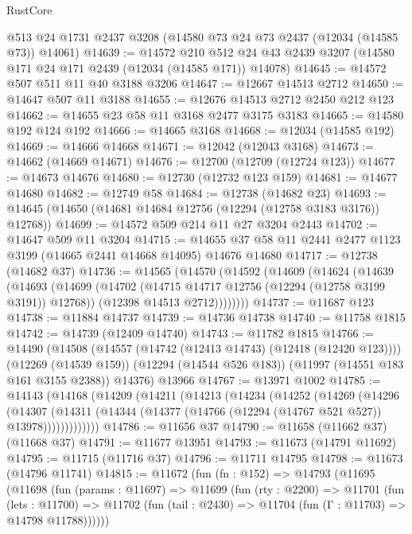 \begin{lexlean}{RustCore}
\begin{coremodule}
    @513
    @24
    @1731
    @2437
    @3208
    (@14580 @73 @24 @73 @2437 (@12034 (@14585 @73)) @14061)
@14639 := @14572
    @210
    @512
    @24
    @43
    @2439
    @3207
    (@14580 @171 @24 @171 @2439 (@12034 (@14585 @171)) @14078)
@14645 := @14572 @507 @511 @11 @40 @3188 @3206
@14647 := @12667 @14513 @2712
@14650 := @14647 @507 @11 @3188
@14655 := @12676 @14513 @2712 @2450 @212 @123
@14662 := @14655 @23 @58 @11 @3168 @2477 @3175 @3183
@14665 := @14580 @192 @124 @192
@14666 := @14665 @3168
@14668 := @12034 (@14585 @192)
@14669 := @14666 @14668
@14671 := @12042 (@12043 @3168)
@14673 := @14662 (@14669 @14671)
@14676 := @12700 (@12709 (@12724 @123))
@14677 := @14673 @14676
@14680 := @12730 (@12732 @123 @159)
@14681 := @14677 @14680
@14682 := @12749 @58
@14684 := @12738 (@14682 @23)
@14693 := @14645 (@14650 (@14681 @14684 @12756 (@12294 (@12758 @3183 @3176)) @12768))
@14699 := @14572 @509 @214 @11 @27 @3204 @2443
@14702 := @14647 @509 @11 @3204
@14715 := @14655 @37 @58 @11 @2441 @2477 @1123 @3199 (@14665 @2441 @14668 @14095) @14676 @14680
@14717 := @12738 (@14682 @37)
@14736 := @14565
    (@14570
      (@14592
        (@14609
          (@14624
            (@14639
              (@14693
                (@14699
                  (@14702 (@14715 @14717 @12756 (@12294 (@12758 @3199 @3191)) @12768))
                  (@12398 @14513 @2712))))))))
@14737 := @11687 @123
@14738 := @11884 @14737
@14739 := @14736 @14738
@14740 := @11758 @1815
@14742 := @14739 (@12409 @14740)
@14743 := @11782 @1815
@14766 := @14490
    (@14508
      (@14557 (@14742 (@12413 @14743) (@12418 (@12420 @123))))
      (@12269 (@14539 @159))
      (@12294 (@14544 @526 @183))
      (@11997 (@14551 @183 @161 @3155 @2388))
      @14376)
    @13966
@14767 := @13971 @1002
@14785 := @14143
    (@14168
      (@14209
        (@14211
          (@14213
            (@14234
              (@14252
                (@14269
                  (@14296
                    (@14307
                      (@14311
                        (@14344 (@14377 (@14766 (@12294 (@14767 @521 @527)) @13978)))))))))))))
@14786 := @11656 @37
@14790 := @11658 (@11662 @37) (@11668 @37)
@14791 := @11677 @13951
@14793 := @11673 (@14791 @11692)
@14795 := @11715 (@11716 @37)
@14796 := @11711 @14795
@14798 := @11673 (@14796 @11741)
@14815 := @11672
    (fun (fn : @152) =>
    @14793
      (@11695
        (@11698
          (fun (params : @11697) =>
          @11699
            (fun (rty : @2200) =>
            @11701
              (fun (lets : @11700) =>
              @11702 (fun (tail : @2430) => @11704 (fun (Γ : @11703) => @14798 @11788))))))

\end{coremodule}
\end{lexlean}
